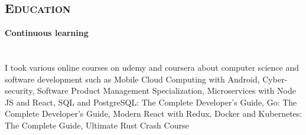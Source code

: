 \begin{resume}
%
%
%
%
%
%
%


        \section{\textsc{Education}}

        \textbf{Continuous learning} \ \ \ \ \ \ \ \ \ \ \ \ \ \ \ \ \ \ \ \ \ \ \ \ \ \ \ \ \ \ \ \ \ \ \ \ \ \ \ \ \ \ \ \ \ \ \ \ \ \ \ \ \ \ \ \ \ \ \ \ \ \ \ \ \ \ \ \ \ \ \ \ \ \ \ \ \ \ \ \ \ \  \\
        I took various online courses on udemy and coursera about computer science and software development such as
        Mobile Cloud Computing with Android, %
        Cyber-security, %
        Software Product Management Specialization, %
        Microservices with Node JS and React,
        SQL and PostgreSQL: The Complete Developer's Guide,
        Go: The Complete Developer's Guide,
        Modern React with Redux,
        Docker and Kubernetes: The Complete Guide,
        Ultimate Rust Crash Course


\end{resume}
